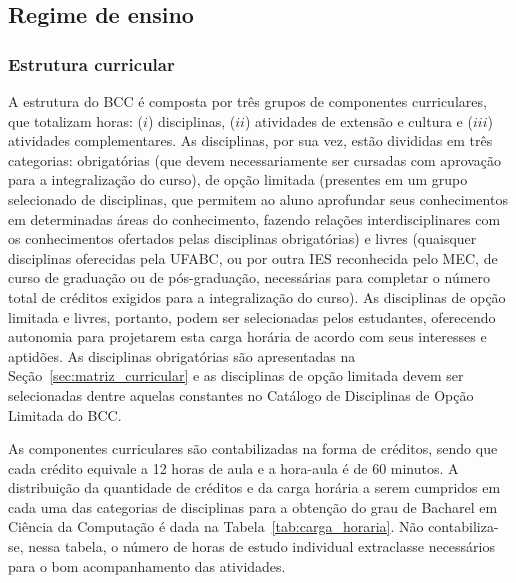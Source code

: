 \subsection{Regime de ensino}

\subsubsection{Estrutura curricular}

A estrutura do BCC é composta por três grupos de componentes curriculares, que
totalizam  horas: ($i$) disciplinas, ($ii$) atividades de extensão e
cultura e ($iii$) atividades complementares.
As disciplinas, por sua vez, estão divididas em três categorias: obrigatórias
(que devem necessariamente ser cursadas com aprovação para a integralização do
curso), de opção limitada (presentes em um grupo selecionado de disciplinas,
que permitem ao aluno aprofundar seus conhecimentos em determinadas áreas do
conhecimento, fazendo relações interdisciplinares com os conhecimentos
ofertados pelas disciplinas obrigatórias) e livres (quaisquer disciplinas
oferecidas pela UFABC, ou por outra IES reconhecida pelo MEC, de curso de
graduação ou de pós-graduação, necessárias para completar o número total de
créditos exigidos para a integralização do curso).
As disciplinas de opção limitada e livres, portanto, podem ser selecionadas
pelos estudantes, oferecendo autonomia para projetarem esta carga horária de
acordo com seus interesses e aptidões.
As disciplinas obrigatórias são apresentadas na
Seção~\ref{sec:matriz_curricular} e as disciplinas de opção limitada devem ser
selecionadas dentre aquelas constantes no Catálogo de Disciplinas de Opção
Limitada do BCC.

As componentes curriculares são contabilizadas na forma de créditos, sendo que
cada crédito equivale a 12 horas de aula e a hora-aula é de 60 minutos.
A distribuição da quantidade de créditos e da carga horária a serem cumpridos
em cada uma das categorias de disciplinas para a obtenção do grau de Bacharel
em Ciência da Computação é dada na Tabela~\ref{tab:carga_horaria}.
Não contabiliza-se, nessa tabela, o número de horas de estudo individual
extraclasse necessários para o bom acompanhamento das atividades.

